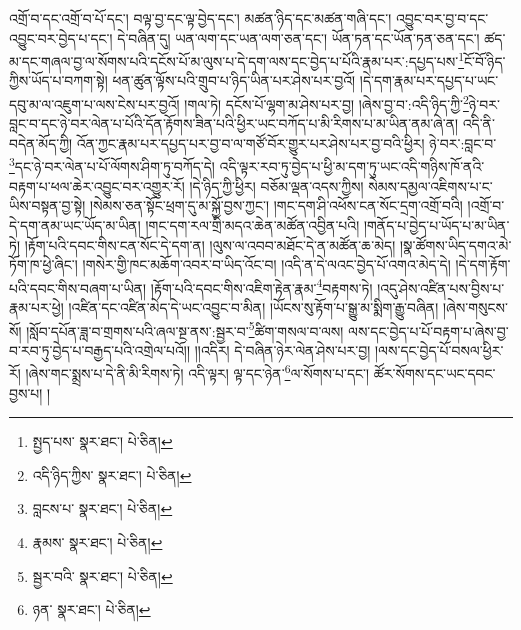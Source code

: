 འགྲོ་བ་དང་འགྲོ་བ་པོ་དང་། བལྟ་བྱ་དང་ལྟ་བྱེད་དང་། མཚན་ཉིད་དང་མཚན་གཞི་དང་། འབྱུང་བར་བྱ་བ་དང་འབྱུང་བར་བྱེད་པ་དང་། དེ་བཞིན་དུ། ཡན་ལག་དང་ཡན་ལག་ཅན་དང་། ཡོན་ཏན་དང་ཡོན་ཏན་ཅན་དང་། ཚད་མ་དང་གཞལ་བྱ་ལ་སོགས་པའི་དངོས་པོ་མ་ལུས་པ་དེ་དག་ལས་དང་བྱེད་པ་པོའི་རྣམ་པར་:དཔྱད་པས་\footnote{སྤྱད་པས་  སྣར་ཐང་།  པེ་ཅིན། }ངོ་བོ་ཉིད་ཀྱིས་ཡོད་པ་བཀག་སྟེ། ཕན་ཚུན་ལྟོས་པའི་གྲུབ་པ་ཉིད་ཡིན་པར་ཤེས་པར་བྱའོ། །དེ་དག་རྣམ་པར་དཔྱད་པ་ཡང་དབུ་མ་ལ་འཇུག་པ་ལས་ངེས་པར་བྱའོ། །གལ་ཏེ། དངོས་པོ་ལྷག་མ་ཤེས་པར་བྱ། །ཞེས་བྱ་བ་:འདི་ཉིད་ཀྱི་\footnote{འདི་ཉིད་ཀྱིས་  སྣར་ཐང་།  པེ་ཅིན། }ཉེ་བར་བླང་བ་དང་ཉེ་བར་ལེན་པ་པོའི་དོན་རྟོགས་ཟིན་པའི་ཕྱིར་ཡང་བཀོད་པ་མི་རིགས་པ་མ་ཡིན་ནམ་ཞེ་ན། འདི་ནི་བདེན་མོད་ཀྱི། འོན་ཀྱང་རྣམ་པར་དཔྱད་པར་བྱ་བ་ལ་གཙོ་བོར་གྱུར་པར་ཤེས་པར་བྱ་བའི་ཕྱིར། ཉེ་བར་:བླང་བ་\footnote{བླངས་པ་  སྣར་ཐང་།  པེ་ཅིན། }དང་ཉེ་བར་ལེན་པ་པོ་ལོགས་ཤིག་ཏུ་བཀོད་དེ། འདི་ལྟར་རབ་ཏུ་བྱེད་པ་ཕྱི་མ་དག་ཏུ་ཡང་འདི་གཉིས་ཁོ་ནའི་བརྟག་པ་ཕལ་ཆེར་འབྱུང་བར་འགྱུར་རོ། །དེ་ཉིད་ཀྱི་ཕྱིར། བཅོམ་ལྡན་འདས་ཀྱིས། སེམས་དམྱལ་འཇིགས་པ་ང་ཡིས་བསྟན་བྱ་སྟེ། །སེམས་ཅན་སྟོང་ཕྲག་དུ་མ་སྐྱོ་བྱས་ཀྱང་། །གང་དག་ཤི་འཕོས་ངན་སོང་དྲག་འགྲོ་བའི། །འགྲོ་བ་དེ་དག་ནམ་ཡང་ཡོད་མ་ཡིན། །གང་དག་རལ་གྲི་མདའ་ཆེན་མཚོན་འབྱིན་པའི། །གནོད་པ་བྱེད་པ་ཡོད་པ་མ་ཡིན་ཏེ། །རྟོག་པའི་དབང་གིས་ངན་སོང་དེ་དག་ན། །ལུས་ལ་འབབ་མཐོང་དེ་ན་མཚོན་ཆ་མེད། །སྣ་ཚོགས་ཡིད་དགའ་མེ་ཏོག་ཁ་ཕྱེ་ཞིང་། །གསེར་གྱི་ཁང་མཆོག་འབར་བ་ཡིད་འོང་བ། །འདི་ན་དེ་ལའང་བྱེད་པོ་འགའ་མེད་དེ། །དེ་དག་རྟོག་པའི་དབང་གིས་བཞག་པ་ཡིན། །རྟོག་པའི་དབང་གིས་འཇིག་རྟེན་རྣམ་\footnote{རྣམས་  སྣར་ཐང་།  པེ་ཅིན། }བརྟགས་ཏེ། །འདུ་ཤེས་འཛིན་པས་བྱིས་པ་རྣམ་པར་ཕྱེ། །འཛིན་དང་འཛིན་མེད་དེ་ཡང་འབྱུང་བ་མིན། །ཡོངས་སུ་རྟོག་པ་སྒྱུ་མ་སྨིག་རྒྱུ་བཞིན། །ཞེས་གསུངས་སོ། །སློབ་དཔོན་ཟླ་བ་གྲགས་པའི་ཞལ་སྔ་ནས་:སྦྱར་བ་\footnote{སྦྱར་བའི་  སྣར་ཐང་།  པེ་ཅིན། }ཚིག་གསལ་བ་ལས། ལས་དང་བྱེད་པ་པོ་བརྟག་པ་ཞེས་བྱ་བ་རབ་ཏུ་བྱེད་པ་བརྒྱད་པའི་འགྲེལ་པའོ།། །།འདིར། དེ་བཞིན་ཉེར་ལེན་ཤེས་པར་བྱ། །ལས་དང་བྱེད་པོ་བསལ་ཕྱིར་རོ། །ཞེས་གང་སྨྲས་པ་དེ་ནི་མི་རིགས་ཏེ། འདི་ལྟར། ལྟ་དང་ཉེན་\footnote{ཉན་  སྣར་ཐང་།  པེ་ཅིན། }ལ་སོགས་པ་དང་། ཚོར་སོགས་དང་ཡང་དབང་བྱས་པ། །
